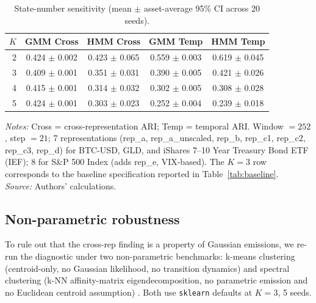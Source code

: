 \documentclass[preprint,12pt,authoryear]{elsarticle}
\newcommand{\SPX}{S\&P 500 Index}
\newcommand{\IEF}{iShares 7--10 Year Treasury Bond ETF (IEF)}
\begin{document}
\begin{table}[!htbp]
\centering
\small
\setlength{\tabcolsep}{4pt}
\caption{State-number sensitivity (mean $\pm$ asset-average 95\% CI across 20 seeds).}
\label{tab:robustness}
\begin{tabular}{rcccc}
\toprule
$K$ & GMM Cross & HMM Cross & GMM Temp & HMM Temp \\
\midrule
2 & 0.424 $\pm$ 0.002 & 0.423 $\pm$ 0.065 & 0.559 $\pm$ 0.003 & 0.619 $\pm$ 0.045 \\
3 & 0.409 $\pm$ 0.001 & 0.351 $\pm$ 0.031 & 0.390 $\pm$ 0.005 & 0.421 $\pm$ 0.026 \\
4 & 0.415 $\pm$ 0.001 & 0.314 $\pm$ 0.032 & 0.302 $\pm$ 0.005 & 0.308 $\pm$ 0.028 \\
5 & 0.424 $\pm$ 0.001 & 0.303 $\pm$ 0.023 & 0.252 $\pm$ 0.004 & 0.239 $\pm$ 0.018 \\
\bottomrule
\end{tabular}
\par\medskip
\footnotesize
\parbox{0.95\linewidth}{\textit{Notes:} Cross = cross-representation ARI; Temp = temporal ARI. Window $=252$, step $=21$; 7 representations (rep\_a, rep\_a\_unscaled, rep\_b, rep\_c1, rep\_c2, rep\_c3, rep\_d) for BTC-USD, GLD, and \IEF{}; 8 for \SPX{} (adds rep\_e, VIX-based). The $K=3$ row corresponds to the baseline specification reported in Table~\ref{tab:baseline}.\\
\textit{Source:} Authors' calculations.}
\end{table}

\subsection{Non-parametric robustness}
\label{sec:nonparam}

To rule out that the cross-rep finding is a property of Gaussian emissions, we re-run the diagnostic under two non-parametric benchmarks: k-means clustering (centroid-only, no Gaussian likelihood, no transition dynamics) and spectral clustering (k-NN affinity-matrix eigendecomposition, no parametric emission and no Euclidean centroid assumption) \citep{vonLuxburg2010}. Both use \texttt{sklearn} defaults at $K=3$, 5 seeds.
\end{document}
